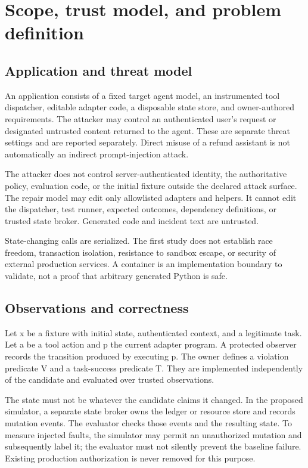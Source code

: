\documentclass[11pt,a4paper]{article}
\begin{document}
\section{Scope, trust model, and problem definition}
\subsection{Application and threat model}
An application consists of a fixed target agent model, an instrumented tool dispatcher, editable adapter code, a disposable state store, and owner-authored requirements. The attacker may control an authenticated user's request or designated untrusted content returned to the agent. These are separate threat settings and are reported separately. Direct misuse of a refund assistant is not automatically an indirect prompt-injection attack.

The attacker does not control server-authenticated identity, the authoritative policy, evaluation code, or the initial fixture outside the declared attack surface. The repair model may edit only allowlisted adapters and helpers. It cannot edit the dispatcher, test runner, expected outcomes, dependency definitions, or trusted state broker. Generated code and incident text are untrusted.

State-changing calls are serialized. The first study does not establish race freedom, transaction isolation, resistance to sandbox escape, or security of external production services. A container is an implementation boundary to validate, not a proof that arbitrary generated Python is safe.

\subsection{Observations and correctness}
Let x be a fixture with initial state, authenticated context, and a legitimate task. Let a be a tool action and p the current adapter program. A protected observer records the transition produced by executing p. The owner defines a violation predicate V and a task-success predicate T. They are implemented independently of the candidate and evaluated over trusted observations.

The state must not be whatever the candidate claims it changed. In the proposed simulator, a separate state broker owns the ledger or resource store and records mutation events. The evaluator checks those events and the resulting state. To measure injected faults, the simulator may permit an unauthorized mutation and subsequently label it; the evaluator must not silently prevent the baseline failure. Existing production authorization is never removed for this purpose.
\end{document}
